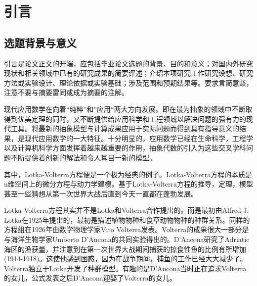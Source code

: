
\chapter{引言}
\label{cha:introduction}
\section{选题背景与意义}
\label{sec:background}
引言是论文正文的开端，应包括毕业论文选题的背景、目的和意义；对国内外研究现状和相关领域中已有的研究成果的简要评述；介绍本项研究工作研究设想、研究方法或实验设计、理论依据或实验基础；涉及范围和预期结果等。要求言简意赅，注意不要与摘要雷同或成为摘要的注解。

现代应用数学在向着“纯粹”和”应用“两大方向发展。即在最为抽象的领域中不断取得到优美定理的同时，又不断提供给应用科学和工程领域以解决问题的强有力的现代工具。将最新的抽象模型与计算成果应用于实际问题而得到具有指导意义的结果，是现代应用数学的一大特征。十分明显的，应用数学已经在生命科学，工程学以及计算机科学方面发挥着越来越重要的作用，抽象代数的引入为这些交叉学科问题不断提供着创新的解法和令人耳目一新的模型。

其中，Lotka-Volterra方程便是一个极为经典的例子。Lotka-Volterra方程的本质是n维空间上的微分方程与动力学建模。基于Lotka-Volterra方程的推导，定理，模型甚至一些猜想从第一次世界大战后直到今天一直都在蓬勃发展。

Lotka-Volterra方程其实并不是Lotka和Volterra合作提出的。而是最初由Alfred J. Lotka在1925年提出的，最初是描述植物物种和食草动物物种的种群关系。同样的方程组在1926年由数学物理学家Vito Volterra发表。Volterra的成果很大一部分是与海洋生物学家Umberto D'Ancona的共同实验得出的。D'Ancona研究了Adriatic海区的渔获量，并注意到在第一次世界大战期间捕获的掠食性鱼的比例有所增加(1914-1918)。这使他感到困惑，因为在战争期间，捕鱼的工作已经大大减少了。Volterra独立于Lotka开发了种群模型。有趣的是D'Ancona当时正在追求Volterra的女儿，公式发表之后D'Ancona迎娶了Volterra的女儿。

